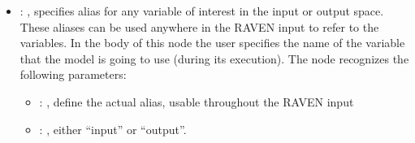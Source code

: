 \begin{itemize}
    \item {}: , 
      specifies alias for         any variable of interest in the input or output space. These
      aliases can be used anywhere in the RAVEN input to         refer to the variables. In the body
      of this node the user specifies the name of the variable that the model is going to use
      (during its execution).
      The  node recognizes the following parameters:
        \begin{itemize}
          \item {}: , 
            define the actual alias, usable throughout the RAVEN input
          \item {}: , 
            either ``input'' or ``output''.
      \end{itemize}


\end{itemize}
